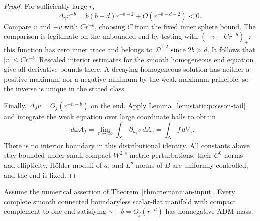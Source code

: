 \begin{proof}
For sufficiently large $r$,
\[
 \Delta_\gamma r^{-b}
      =b(b-d)r^{-b-2}+O(r^{-b-d-2})<0.
\]
Compare $v$ and $-v$ with $Cr^{-b}$, choosing $C$ from the fixed
inner sphere bound.  The comparison is legitimate on the unbounded
end by testing with $(\pm v-Cr^{-b})_+$: this function has zero inner
trace and belongs to $\mathcal D^{1,2}$ since $2b>d$.
It follows that $|v|\le Cr^{-b}$.  Rescaled interior estimates for
the smooth homogeneous end equation give all derivative bounds
there.  A decaying homogeneous solution has neither a positive
maximum nor a negative minimum by the weak maximum principle, so
the inverse is unique in the stated class.

Finally,
$\Delta_\delta v=O_j(r^{-n-b})$ on the end.  Apply
Lemma~\ref{lem:static:poisson-tail} and integrate the weak equation
over large coordinate balls to obtain
\[
 -d\omega A_f
   =\lim_{r\to\infty}\int_{S_r}\partial_{\nu_\gamma}v\,dA_\gamma
   =\int_N f\,dV_\gamma.
\]
There is no interior boundary in this distributional identity.
All constants above stay bounded under small compact $W^{2,s}$
metric perturbations: their $C^0$ norms and ellipticity, H\"older
moduli of $a$, and $L^p$ norms of $B$ are uniformly controlled, and
the end is fixed.
\end{proof}

\begin{lemma}
\label{lem:static:smooth-nonnegative-mass}
Assume the numerical assertion of Theorem~\ref{thm:riemannian-input}.
Every complete smooth connected boundaryless scalar-flat manifold
with compact complement to one end satisfying
$\gamma-\delta=O_j(r^{-d})$ has nonnegative ADM mass.
\end{lemma}

